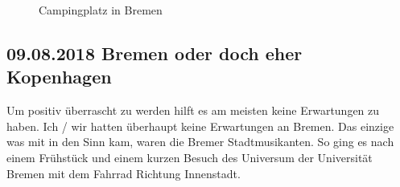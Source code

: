 \begin{figure}[H]
   \centering
   \quad
   \quad
   \quad
   \caption[Campingplatz in Bremen]{Campingplatz in Bremen}
\end{figure}

\subsection{09.08.2018 Bremen oder doch eher Kopenhagen}
Um positiv überrascht zu werden hilft es am meisten keine Erwartungen zu haben.
Ich / wir hatten überhaupt keine Erwartungen an Bremen.
Das einzige was mit in den Sinn kam, waren die Bremer Stadtmusikanten.
So ging es nach einem Frühstück und einem kurzen Besuch des Universum der Universität Bremen mit dem Fahrrad Richtung Innenstadt.

